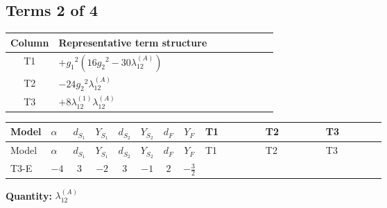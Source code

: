 \documentclass[8pt]{article}
\begin{document}
\begin{landscape}
\subsection*{Terms 2 of 4}
\begin{center}
\begin{tabular}{@{}c >{\raggedright\arraybackslash}p{0.82\linewidth}@{}}
\toprule
Column & Representative term structure \\
\midrule
T1 & \(\displaystyle +{g_1}^2 \left(16 {g_2}^2-30 {\lambda_{12}^{(A)}}\right)\) \\
\midrule
T2 & \(\displaystyle -24 {g_2}^2 {\lambda_{12}^{(A)}}\) \\
\midrule
T3 & \(\displaystyle +8 {\lambda_{12}^{(1)}} {\lambda_{12}^{(A)}}\) \\
\midrule
\bottomrule
\end{tabular}
\end{center}
\smallskip
\tiny
\begin{longtable}{@{}llcccccc >{\raggedright\arraybackslash}p{0.21\linewidth} >{\raggedright\arraybackslash}p{0.21\linewidth} >{\raggedright\arraybackslash}p{0.21\linewidth}@{}}
\toprule
Model & $\alpha$ & $d_{S_1}$ & $Y_{S_1}$ & $d_{S_2}$ & $Y_{S_2}$ & $d_F$ & $Y_F$ & T1 & T2 & T3 \\
\midrule
\endfirsthead
\toprule
Model & $\alpha$ & $d_{S_1}$ & $Y_{S_1}$ & $d_{S_2}$ & $Y_{S_2}$ & $d_F$ & $Y_F$ & T1 & T2 & T3 \\
\midrule
\endhead
T3-E & $-4$ & $3$ & $-2$ & $3$ & $-1$ & $2$ & $-\frac{3}{2}$ & \scriptsize\adjustbox{max width=\linewidth}{$\begin{gathered} +{g_1}^2 \left(16 {g_2}^2-30 {\lambda_{12}^{(A)}}\right)\end{gathered}$} & \scriptsize\adjustbox{max width=\linewidth}{$\begin{gathered} -24 {g_2}^2 {\lambda_{12}^{(A)}}\end{gathered}$} & \scriptsize\adjustbox{max width=\linewidth}{$\begin{gathered} +8 {\lambda_{12}^{(1)}} {\lambda_{12}^{(A)}}\end{gathered}$} \\
\midrule
\bottomrule
\end{longtable}
\clearpage
\noindent\textbf{Quantity: }$\lambda_{12}^{(A)}$\par\smallskip

\end{landscape}
\end{document}
